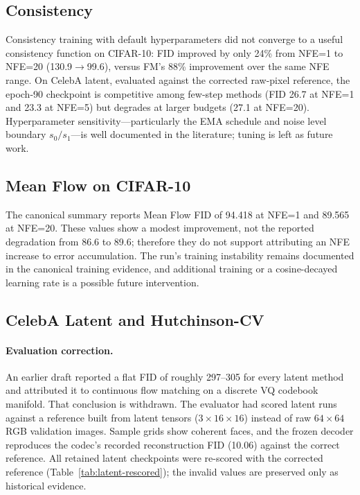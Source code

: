 \subsection{Consistency}

Consistency training with default hyperparameters did not converge to a useful
consistency function on CIFAR-10: FID improved by only 24\% from NFE=1 to NFE=20
(130.9$\rightarrow$99.6), versus FM's 88\% improvement over the same NFE range.
On CelebA latent, evaluated against the corrected raw-pixel reference, the
epoch-90 checkpoint is competitive among few-step methods (FID 26.7 at NFE=1 and
23.3 at NFE=5) but degrades at larger budgets (27.1 at NFE=20). Hyperparameter
sensitivity---particularly the EMA schedule and noise level boundary
$s_0/s_1$---is well documented in the literature; tuning is left as future work.

\subsection{Mean Flow on CIFAR-10}

The canonical summary reports Mean Flow FID of 94.418 at NFE=1 and 89.565 at
NFE=20. These values show a modest improvement, not the reported degradation
from 86.6 to 89.6; therefore they do not support attributing an NFE increase to
error accumulation. The run's training instability remains documented in the
canonical training evidence, and additional training or a cosine-decayed
learning rate is a possible future intervention.

\subsection{CelebA Latent and Hutchinson-CV}

\paragraph{Evaluation correction.} An earlier draft reported a flat FID of
roughly 297--305 for every latent method and attributed it to continuous flow
matching on a discrete VQ codebook manifold. That conclusion is withdrawn. The
evaluator had scored latent runs against a reference built from latent tensors
($3\times16\times16$) instead of raw $64\times64$ RGB validation images. Sample
grids show coherent faces, and the frozen decoder reproduces the codec's recorded
reconstruction FID (10.06) against the correct reference. All retained latent
checkpoints were re-scored with the corrected reference
(Table~\ref{tab:latent-rescored}); the invalid values are preserved only as
historical evidence.

